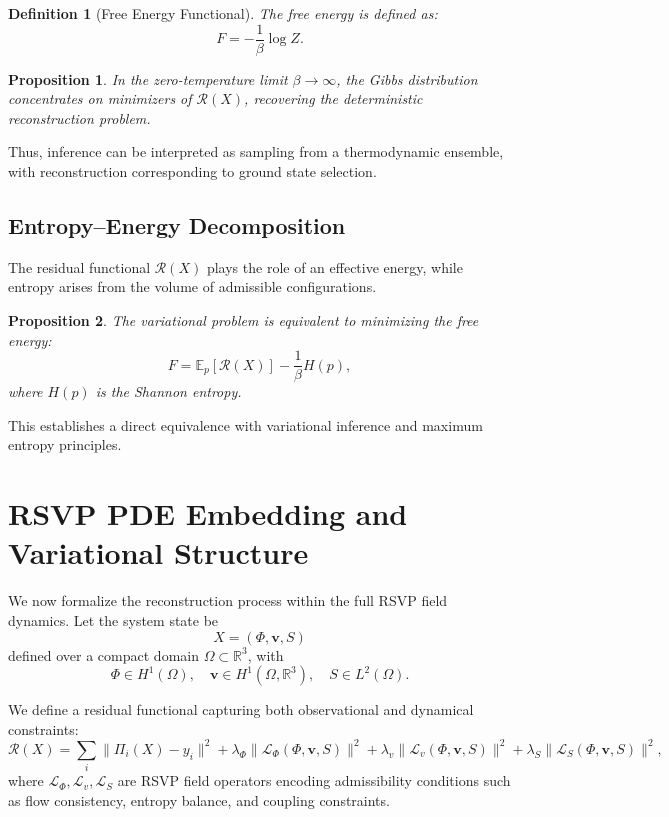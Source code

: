 \documentclass[12pt]{article}
\newtheorem{definition}{Definition}
\newtheorem{proposition}{Proposition}
\begin{document}
\begin{definition}[Free Energy Functional]
The free energy is defined as:
\[
F = -\frac{1}{\beta} \log Z.
\]
\end{definition}

\begin{proposition}
In the zero-temperature limit $\beta \to \infty$, the Gibbs distribution concentrates on minimizers of $\mathcal{R}(X)$, recovering the deterministic reconstruction problem.
\end{proposition}

Thus, inference can be interpreted as sampling from a thermodynamic ensemble, with reconstruction corresponding to ground state selection.

\subsection{Entropy--Energy Decomposition}

The residual functional $\mathcal{R}(X)$ plays the role of an effective energy, while entropy arises from the volume of admissible configurations.

\begin{proposition}
The variational problem is equivalent to minimizing the free energy:
\[
F = \mathbb{E}_{p}\!\left[ \mathcal{R}(X) \right] - \frac{1}{\beta} H(p),
\]
where $H(p)$ is the Shannon entropy.
\end{proposition}

This establishes a direct equivalence with variational inference and maximum entropy principles.

\section{RSVP PDE Embedding and Variational Structure}

We now formalize the reconstruction process within the full RSVP field dynamics. Let the system state be
\[
X = (\Phi, \mathbf{v}, S)
\]
defined over a compact domain $\Omega \subset \mathbb{R}^3$, with
\[
\Phi \in H^1(\Omega), \quad \mathbf{v} \in H^1(\Omega, \mathbb{R}^3), \quad S \in L^2(\Omega).
\]

We define a residual functional capturing both observational and dynamical constraints:
\[
\mathcal{R}(X) = \sum_i \|\Pi_i(X) - y_i\|^2 + \lambda_\Phi \|\mathcal{L}_\Phi(\Phi, \mathbf{v}, S)\|^2 + \lambda_v \|\mathcal{L}_v(\Phi, \mathbf{v}, S)\|^2 + \lambda_S \|\mathcal{L}_S(\Phi, \mathbf{v}, S)\|^2,
\]
where $\mathcal{L}_\Phi, \mathcal{L}_v, \mathcal{L}_S$ are RSVP field operators encoding admissibility conditions such as flow consistency, entropy balance, and coupling constraints.
\end{document}
